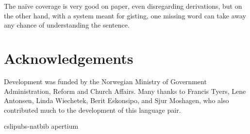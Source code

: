 \documentclass{book}
\begin{document}
The na\"{i}ve coverage is very good on paper, even disregarding
derivations, but on the other hand, with a system meant for gisting,
one missing word can take away any chance of understanding the
sentence.

\section*{Acknowledgements}
Development was funded by the Norwegian Ministry of Government
Administration, Reform and Church Affairs. Many thanks to Francis
Tyers, Lene Antonsen, Linda Wiechetek, Berit Eskonsipo, and Sjur
Moshagen, who also contributed much to the development of this
language pair.                  %



 {cslipubs-natbib}
 {apertium}


\backmatter
\end{document}
